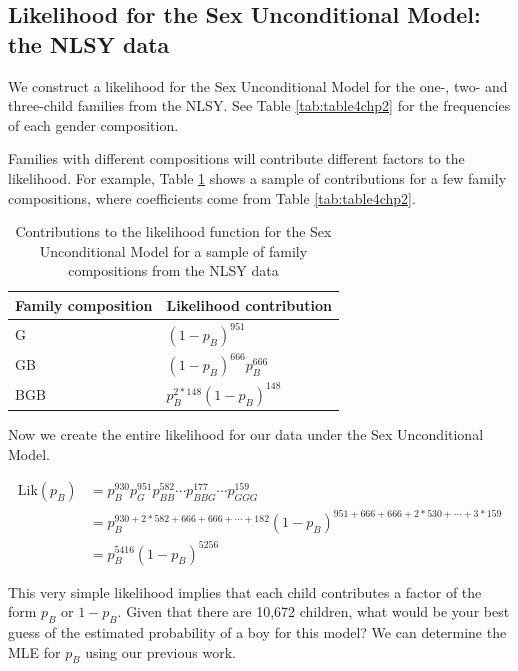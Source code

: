 \documentclass[
]{krantz}
\newcommand{\Lik}{\mathrm{Lik}}
\begin{document}
\hypertarget{likelihood-for-the-sex-unconditional-model-the-nlsy-data}{%
\subsection{Likelihood for the Sex Unconditional Model: the NLSY data}\label{likelihood-for-the-sex-unconditional-model-the-nlsy-data}}

We construct a likelihood for the Sex Unconditional Model for the one-, two- and three-child families from the NLSY. See Table \ref{tab:table4chp2} for the frequencies of each gender composition.

Families with different compositions will contribute different factors to the likelihood. For example, Table \ref{tab:sexuncondmodel} shows a sample of contributions for a few family compositions, where coefficients come from Table \ref{tab:table4chp2}.

\begin{table}

\caption{\label{tab:sexuncondmodel}Contributions to the likelihood function for the Sex Unconditional Model for a sample of family compositions from the NLSY data}
\centering
\begin{tabular}[t]{>{\raggedright\arraybackslash}p{5cm}>{\raggedright\arraybackslash}p{5cm}}
\toprule
Family composition & Likelihood contribution\\
\midrule
G & $(1-p_B)^{951}$\\
GB & $(1-p_B)^{666}p_B^{666}$\\
BGB & $p_B^{2*148}(1-p_B)^{148}$\\
\bottomrule
\end{tabular}
\end{table}

Now we create the entire likelihood for our data under the Sex Unconditional Model.

\begin{align*}
 \Lik(p_B) &= p_B^{930}p_G^{951}p_{BB}^{582} \cdots p_{BBG}^{177} \cdots p_{GGG}^{159} \\
 &= p_B^{930+2*582+666+666+\cdots+182}(1-p_B)^{951+666+666+2*530+\cdots+3*159} \\
 &=  p_B^{5416}(1-p_B)^{5256}
\end{align*}

This very simple likelihood implies that each child contributes a factor of the form \(p_B\) or \(1-p_B\). Given that there are 10,672 children, what would be your best guess of the estimated probability of a boy for this model? We can determine the MLE for \(p_B\) using our previous work.
\end{document}
